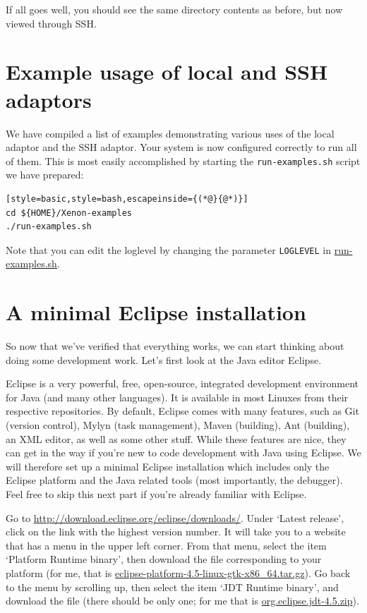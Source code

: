 \documentclass[12pt, a4paper, twoside, openany, titlepage]{book}
\begin{document}
If all goes well, you should see the same directory contents as before, but now viewed through SSH.

\section{Example usage of local and SSH adaptors}

We have compiled a list of examples demonstrating various uses of the local adaptor and the SSH adaptor. Your system is now configured correctly to run all of them. This is most easily accomplished by starting the \texttt{run-examples.sh} script we have prepared:
\begin{lstlisting}[style=basic,style=bash,escapeinside={(*@}{@*)}]
cd ${HOME}/Xenon-examples
./run-examples.sh
\end{lstlisting} %

Note that you can edit the loglevel by changing the parameter \texttt{LOGLEVEL} in \url{run-examples.sh}.





\section{A minimal Eclipse installation}

So now that we've verified that everything works, we can start thinking about doing some development work. Let's first look at the Java editor Eclipse.

Eclipse is a very powerful, free, open-source, integrated development environment for Java (and many other languages). It is available in most Linuxes from their respective repositories. By default, Eclipse comes with many features, such as Git (version control), Mylyn (task management), Maven (building), Ant (building), an XML editor, as well as some other stuff. While these features are nice, they can get in the way if you're new to code development with Java using Eclipse. We will therefore set up a minimal Eclipse installation which includes only the Eclipse platform and the Java related tools (most importantly, the debugger). Feel free to skip this next part if you're already familiar with Eclipse.


Go to \url{http://download.eclipse.org/eclipse/downloads/}. Under `Latest release', click on the link with the highest version number. It will take you to a website that has a menu in the upper left corner. From that menu, select the item `Platform Runtime binary', then download the file corresponding to your platform (for me, that is \url{eclipse-platform-4.5-linux-gtk-x86_64.tar.gz}). Go back to the menu by scrolling up, then select the item `JDT Runtime binary', and download the file (there should be only one; for me that is \url{org.eclipse.jdt-4.5.zip}).
\end{document}
